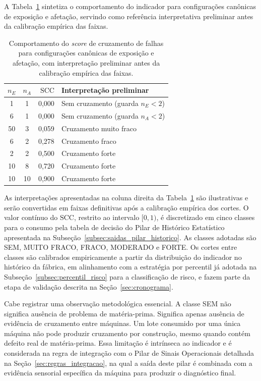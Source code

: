 A Tabela~\ref{tab:scc_casos} sintetiza o comportamento do indicador para configurações canônicas de exposição e afetação, servindo como referência interpretativa preliminar antes da calibração empírica das faixas.

\begin{table}[htbp]
    \centering
    \footnotesize
    \caption{Comportamento do \emph{score} de cruzamento de falhas para configurações canônicas de exposição e afetação, com interpretação preliminar antes da calibração empírica das faixas.}
    \label{tab:scc_casos}
    \begin{tabular}{ccrl}
        \toprule
        $n_E$ & $n_A$ & $\text{SCC}$ & \textbf{Interpretação preliminar} \\
        \midrule
        1  & 1  & 0,000 & Sem cruzamento (guarda $n_E < 2$) \\
        6  & 1  & 0,000 & Sem cruzamento (guarda $n_A < 2$) \\
        50 & 3  & 0,059 & Cruzamento muito fraco \\
        6  & 2  & 0,278 & Cruzamento fraco \\
        2  & 2  & 0,500 & Cruzamento forte \\
        10 & 8  & 0,720 & Cruzamento forte \\
        10 & 10 & 0,900 & Cruzamento forte \\
        \bottomrule
    \end{tabular}
\end{table}

As interpretações apresentadas na coluna direita da Tabela~\ref{tab:scc_casos} são ilustrativas e serão convertidas em faixas definitivas após a calibração empírica dos cortes. O valor contínuo do $\text{SCC}$, restrito ao intervalo $[0, 1)$, é discretizado em cinco classes para o consumo pela tabela de decisão do Pilar de Histórico Estatístico apresentada na Subseção~\ref{subsec:saidas_pilar_historico}. As classes adotadas são SEM, MUITO FRACO, FRACO, MODERADO e FORTE. Os cortes entre classes são calibrados empiricamente a partir da distribuição do indicador no histórico da fábrica, em alinhamento com a estratégia por percentil já adotada na Subseção~\ref{subsec:percentil_risco} para a classificação de risco, e fazem parte da etapa de validação descrita na Seção~\ref{sec:cronograma}.

Cabe registrar uma observação metodológica essencial. A classe SEM não significa ausência de problema de matéria-prima. Significa apenas ausência de evidência de cruzamento entre máquinas. Um lote consumido por uma única máquina não pode produzir cruzamento por construção, mesmo quando contém defeito real de matéria-prima. Essa limitação é intrínseca ao indicador e é considerada na regra de integração com o Pilar de Sinais Operacionais detalhada na Seção~\ref{sec:regras_integracao}, na qual a saída deste pilar é combinada com a evidência sensorial específica da máquina para produzir o diagnóstico final.



